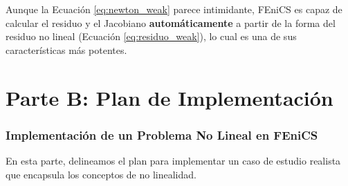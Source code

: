 \documentclass[11pt, a4paper]{article}
\begin{document}
Aunque la Ecuación \ref{eq:newton_weak} parece intimidante, FEniCS es capaz de calcular el residuo y el Jacobiano \textbf{automáticamente} a partir de la forma del residuo no lineal (Ecuación \ref{eq:residuo_weak}), lo cual es una de sus características más potentes.

\newpage
\part*{Parte B: Plan de Implementación}

\section{Implementación de un Problema No Lineal en FEniCS}
En esta parte, delineamos el plan para implementar un caso de estudio realista que encapsula los conceptos de no linealidad.
\end{document}
